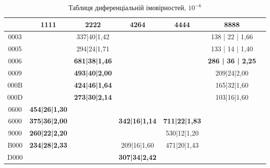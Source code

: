 \documentclass[12pt,a4paper]{article}
\begin{document}
\begin{table}[]
\centering
\begin{tabular}{|c|c|c|c|c|c|c|}
\hline
\backslashbox{$\alpha$}{$\beta$}       & 1111                        & 2222                                               & 4264                        & 4444                        & 8888                        \\ \hline
0003 &                               & 337|40|1,42          &                                                             &                               & 138 | 22 | 1,66          \\ \hline
0005 & \textbf{}                     & 294|24|1,71          & \textbf{}                                          &                               & 133 | 14 | 1,40          \\ \hline
0006 &                               & \textbf{681|38|1,46} &                                                             &                               & \textbf{286 | 36 | 2,25} \\ \hline
0009 &                               & \textbf{493|40|2,00} &                                                              &                               & 209|24|2,00          \\ \hline
000B &                               & \textbf{424|46|1,64} &                                                              &                               & 165|32|1,60          \\ \hline
000D & \textbf{}                     & \textbf{273|30|2,14} & \textbf{}                                          & \textbf{}                     & 103|16|1,60          \\ \hline
0600 & \textbf{454|26|1,30} &            &                                                              &                               &                               \\ \hline
6000 & \textbf{375|36|2,00} &                                & \textbf{342|16|1,14} & \textbf{711|22|1,83} &                               \\ \hline
9000 & \textbf{260|22|2,20} &                                                             &                               & 530|12|1,20          &                               \\ \hline
B000 & \textbf{234|28|2,33} &                                                              & 209|16|1,60          & 471|20|1,43          &                               \\ \hline
D000 &                      &                                                       & \textbf{307|34|2,42} &                               \\ \hline
\end{tabular}
\caption{Таблиця диференціальній імовірностей, $10^{-6}$}
\label{tab:diffs}
\end{table}
\end{document}
